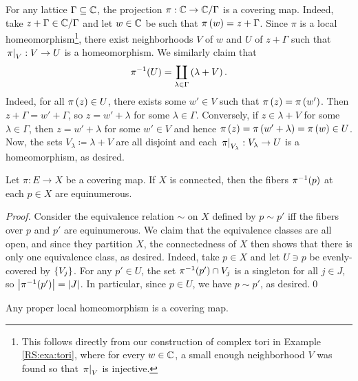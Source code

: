 \documentclass[../Moduli_Spaces_of_Riemann_Surfaces.tex]{subfiles}
\begin{document}
    \begin{example}
        For any lattice $\Gamma\subseteq\mathbb{C}$, the projection $\pi:\mathbb{C}\to\mathbb{C}/\Gamma$ is a covering map. Indeed, take $z+\Gamma\in\mathbb{C}/\Gamma$ and let $w\in\mathbb{C}$ be such that $\pi\left(w\right)=z+\Gamma$. Since $\pi$ is a local homeomorphism\footnote{This follows directly from our construction of complex tori in Example \ref{RS:exa:tori}, where for every $w\in\mathbb{C}$, a small enough neighborhood $V$ was found so that $\left.\pi\right|_V$ is injective.}, there exist neighborhoods $V$ of $w$ and $U$ of $z+\Gamma$ such that $\left.\pi\right|_{V}:V\to U$ is a homeomorphism. We similarly claim that
        \begin{equation*}
            \pi^{-1}\!\left(U\right)=\coprod_{\lambda\in\Gamma}\left(\lambda+V\right).
        \end{equation*}
        Indeed, for all $\pi\left(z\right)\in U$, there exists some $w'\in V$ such that $\pi\left(z\right)=\pi\left(w'\right)$. Then $z+\Gamma=w'+\Gamma$, so $z=w'+\lambda$ for some $\lambda\in\Gamma$. Conversely, if $z\in\lambda+V$ for some $\lambda\in\Gamma$, then $z=w'+\lambda$ for some $w'\in V$ and hence $\pi\left(z\right)=\pi\left(w'+\lambda\right)=\pi\left(w\right)\in U$. Now, the sets $V_\lambda\coloneqq\lambda+V$ are all disjoint and each $\left.\pi\right|_{V_\lambda}:V_\lambda\to U$ is a homeomorphism, as desired.\exqed
    \end{example}
    \begin{proposition}\label{CS:prp:fiber_cardinalities_coincide}
        Let $\pi:E\to X$ be a covering map. If $X$ is connected, then the fibers $\pi^{-1}\!\left(p\right)$ at each $p\in X$ are equinumerous.
    \end{proposition}
    \begin{proof}
        Consider the equivalence relation $\sim$ on $X$ defined by $p\sim p'$ iff the fibers over $p$ and $p'$ are equinumerous. We claim that the equivalence classes are all open, and since they partition $X$, the connectedness of $X$ then shows that there is only one equivalence class, as desired. Indeed, take $p\in X$ and let $U\ni p$ be evenly-covered by $\left\{V_j\right\}$. For any $p'\in U$, the set $\pi^{-1}\!\left(p'\right)\cap V_j$ is a singleton for all $j\in J$, so $\left|\pi^{-1}\!\left(p'\right)\right|=\left|J\right|$. In particular, since $p\in U$, we have $p\sim p'$, as desired.\qed
    \end{proof}
    \begin{proposition}\label{CS:prp:proper_local_covering}
        Any proper local homeomorphism is a covering map.
    \end{proposition}
\end{document}
